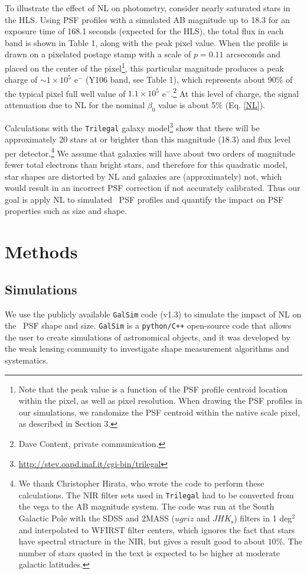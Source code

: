 \documentclass[preprint]{aastex}
\begin{document}
To illustrate the effect of NL on photometry, consider nearly saturated stars in the HLS.  Using PSF profiles with a simulated AB magnitude up to 18.3 for an exposure time of 168.1 seconds (expected for the HLS), the total flux in each band is shown in Table 1, along with the peak pixel value. When the profile is drawn on a pixelated postage stamp with a scale of $p=0.11$ arcseconds and placed on the center of the pixel\footnote{Note that the peak value is a function of the PSF profile centroid location within the pixel, as well as pixel resolution. When drawing the PSF profiles in our simulations, we randomize the PSF centroid within the native scale pixel, as described in Section 3.}, this particular magnitude produces a peak charge of $\sim 1\times 10^5$ e$^{-}$ (Y106 band, see Table 1), which represents about 90\% of the typical pixel full well value of $1.1 \times 10^5$ e$^{-}$.\footnote{Dave Content, private communication.}
At this level of charge, the signal attenuation due to NL for the nominal $\beta_0$ value is about 5\% (Eq. \ref{NL}). 

Calculations with the {\tt{Trilegal}} galaxy model\footnote{\url{http://stev.oapd.inaf.it/cgi-bin/trilegal}} \citep{girardi12} show that there will be approximately 20 stars at or brighter than this magnitude (18.3) and flux level per detector.\footnote{We thank Christopher Hirata, who wrote the code to perform these calculations. The NIR filter sets used in {\tt{Trilegal}} had to be converted from the vega to the AB magnitude system. The code was run at the South Galactic Pole with the SDSS and 2MASS ($ugriz$ and $JHK_\mathrm{s}$) filters in 1 deg$^2$ and interpolated to WFIRST filter centers, which ignores the fact that stars have spectral structure in the NIR, but gives a result good to about $10\%$. The number of stars quoted in the text is expected to be higher at moderate galactic latitudes.} We assume that galaxies will have about two orders of magnitude fewer total electrons than bright stars, and therefore for this quadratic model, star shapes are distorted by NL and galaxies are (approximately) not, which would result in an incorrect PSF correction if not accurately calibrated. Thus our goal is apply NL to simulated \wfa\ PSF profiles and quantify the impact on PSF properties such as size and shape. 

\section{Methods}
\label{methods}
\subsection {Simulations}
We use the publicly available {\tt{GalSim}} code (v1.3) to simulate the impact of NL on the \wfa\ PSF shape and size. {\tt{GalSim}} is a {\tt{python/C++}} open-source code that allows the user to create simulations of astronomical objects, and it was developed by the weak lensing community to investigate shape measurement algorithms and systematics. 
\end{document}
